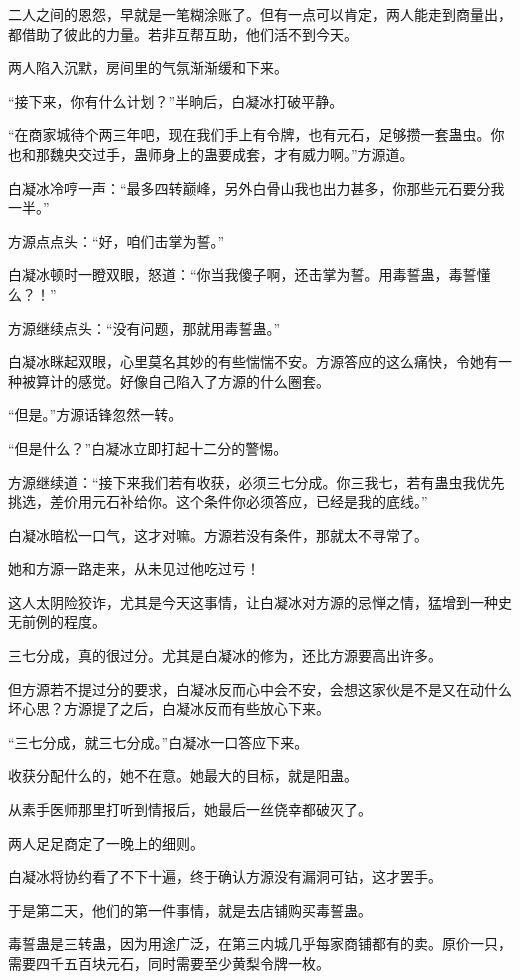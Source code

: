 \begin{this_body}
二人之间的恩怨，早就是一笔糊涂账了。但有一点可以肯定，两人能走到商量出，都借助了彼此的力量。若非互帮互助，他们活不到今天。

两人陷入沉默，房间里的气氛渐渐缓和下来。

“接下来，你有什么计划？”半晌后，白凝冰打破平静。

“在商家城待个两三年吧，现在我们手上有令牌，也有元石，足够攒一套蛊虫。你也和那魏央交过手，蛊师身上的蛊要成套，才有威力啊。”方源道。

白凝冰冷哼一声：“最多四转巅峰，另外白骨山我也出力甚多，你那些元石要分我一半。”

方源点点头：“好，咱们击掌为誓。”

白凝冰顿时一瞪双眼，怒道：“你当我傻子啊，还击掌为誓。用毒誓蛊，毒誓懂么？！”

方源继续点头：“没有问题，那就用毒誓蛊。”

白凝冰眯起双眼，心里莫名其妙的有些惴惴不安。方源答应的这么痛快，令她有一种被算计的感觉。好像自己陷入了方源的什么圈套。

“但是。”方源话锋忽然一转。

“但是什么？”白凝冰立即打起十二分的警惕。

方源继续道：“接下来我们若有收获，必须三七分成。你三我七，若有蛊虫我优先挑选，差价用元石补给你。这个条件你必须答应，已经是我的底线。”

白凝冰暗松一口气，这才对嘛。方源若没有条件，那就太不寻常了。

她和方源一路走来，从未见过他吃过亏！

这人太阴险狡诈，尤其是今天这事情，让白凝冰对方源的忌惮之情，猛增到一种史无前例的程度。

三七分成，真的很过分。尤其是白凝冰的修为，还比方源要高出许多。

但方源若不提过分的要求，白凝冰反而心中会不安，会想这家伙是不是又在动什么坏心思？方源提了之后，白凝冰反而有些放心下来。

“三七分成，就三七分成。”白凝冰一口答应下来。

收获分配什么的，她不在意。她最大的目标，就是阳蛊。

从素手医师那里打听到情报后，她最后一丝侥幸都破灭了。

两人足足商定了一晚上的细则。

白凝冰将协约看了不下十遍，终于确认方源没有漏洞可钻，这才罢手。

于是第二天，他们的第一件事情，就是去店铺购买毒誓蛊。

毒誓蛊是三转蛊，因为用途广泛，在第三内城几乎每家商铺都有的卖。原价一只，需要四千五百块元石，同时需要至少黄梨令牌一枚。


\end{this_body}
